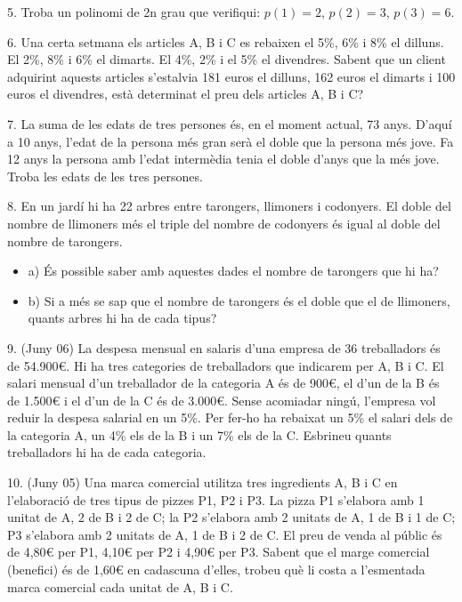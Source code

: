 \documentclass[12pt]{article}
\begin{document}
\begin{exercici}
5. Troba un polinomi de 2n grau que verifiqui: $p(1) = 2$, $p(2) = 3$, $p(3) = 6$.
\end{exercici}

\begin{exercici}
6. Una certa setmana els articles A, B i C es rebaixen el 5\%, 6\% i 8\% el dilluns. El 2\%, 8\% i 6\% el dimarts. El 4\%, 2\% i el 5\% el divendres. Sabent que un client adquirint aquests articles s’estalvia 181 euros el dilluns, 162 euros el dimarts i 100 euros el divendres, està determinat el preu dels articles A, B i C?
\end{exercici}

\begin{exercici}
7. La suma de les edats de tres persones és, en el moment actual, 73 anys. D’aquí a 10 anys, l’edat de la persona més gran serà el doble que la persona més jove. Fa 12 anys la persona amb l’edat intermèdia tenia el doble d’anys que la més jove. Troba les edats de les tres persones.
\end{exercici}

\begin{exercici}
8. En un jardí hi ha 22 arbres entre tarongers, llimoners i codonyers. El doble del nombre de llimoners més el triple del nombre de codonyers és igual al doble del nombre de tarongers.
\begin{itemize}
    \item a) És possible saber amb aquestes dades el nombre de tarongers que hi ha?
    \item b) Si a més se sap que el nombre de tarongers és el doble que el de llimoners, quants arbres hi ha de cada tipus?
\end{itemize}
\end{exercici}

\begin{exercici}
9. (Juny 06) La despesa mensual en salaris d’una empresa de 36 treballadors és de 54.900€. Hi ha tres categories de treballadors que indicarem per A, B i C. El salari mensual d’un treballador de la categoria A és de 900€, el d’un de la B és de 1.500€ i el d’un de la C és de 3.000€. Sense acomiadar ningú, l’empresa vol reduir la despesa salarial en un 5\%. Per fer-ho ha rebaixat un 5\% el salari dels de la categoria A, un 4\% els de la B i un 7\% els de la C. Esbrineu quants treballadors hi ha de cada categoria.
\end{exercici}

\begin{exercici}
10. (Juny 05) Una marca comercial utilitza tres ingredients A, B i C en l’elaboració de tres tipus de pizzes P1, P2 i P3. La pizza P1 s’elabora amb 1 unitat de A, 2 de B i 2 de C; la P2 s’elabora amb 2 unitats de A, 1 de B i 1 de C; P3 s’elabora amb 2 unitats de A, 1 de B i 2 de C. El preu de venda al públic és de 4,80€ per P1, 4,10€ per P2 i 4,90€ per P3. Sabent que el marge comercial (benefici) és de 1,60€ en cadascuna d’elles, trobeu què li costa a l’esmentada marca comercial cada unitat de A, B i C.
\end{exercici}
\end{document}
